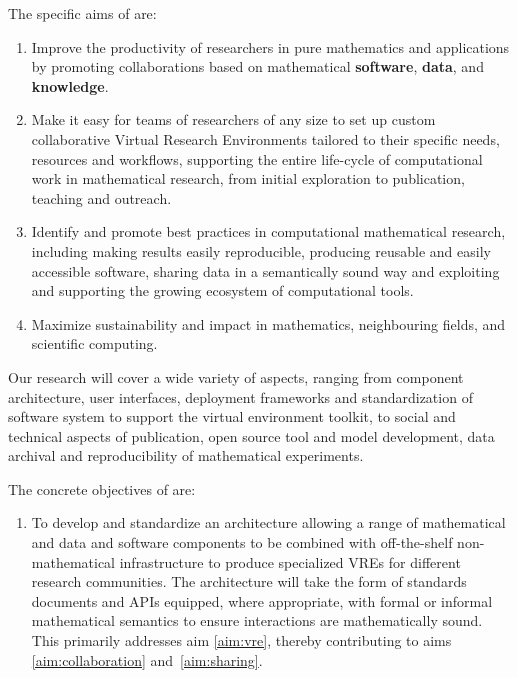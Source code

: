 \documentclass[noworkareas,deliverables,\classoptions]{euproposal}       %
\begin{document}
\begin{proposal}
The specific aims of \TheProject are:
\begin{enumerate}
\item \label{aim:collaboration} Improve the productivity of
  researchers in pure mathematics and applications by promoting
  collaborations based on mathematical \textbf{software},
  \textbf{data}, and \textbf{knowledge}.
\item \label{aim:vre} Make it easy for teams of
  researchers of any size to set up custom collaborative Virtual Research
  Environments tailored to their specific needs, resources and workflows, supporting the
  entire life-cycle of computational work in mathematical research,
  from initial exploration to publication, teaching and outreach.
\item \label{aim:sharing} Identify and promote best practices in
  computational mathematical research, including making results easily
  reproducible, producing reusable and easily accessible
  software, sharing data in a semantically sound way and exploiting and
  supporting the growing ecosystem of computational tools.
\item \label{aim:impact} Maximize sustainability and impact in
  mathematics, neighbouring fields, and scientific computing.
\end{enumerate}

Our research will cover a wide variety of aspects, ranging from
component architecture, user interfaces, deployment frameworks and
standardization of software system to support the \TheProject virtual
environment toolkit, to social and technical aspects of publication,
open source tool and model development, data archival and
reproducibility of mathematical experiments.

The concrete objectives of \TheProject are:

\begin{enumerate}
\item\label{objective:framework} To develop and standardize
  an architecture allowing a range of mathematical and
  data and software components to be combined 
  with off-the-shelf non-mathematical infrastructure to produce
  specialized VREs for different research communities. The
  architecture will take the form of standards documents and APIs
  equipped, where appropriate, with formal or informal mathematical
  semantics to ensure interactions are mathematically sound. This primarily
  addresses aim \ref{aim:vre}, thereby contributing to aims
  \ref{aim:collaboration} and~\ref{aim:sharing}. 


\end{enumerate}
\end{proposal}
\end{document}
